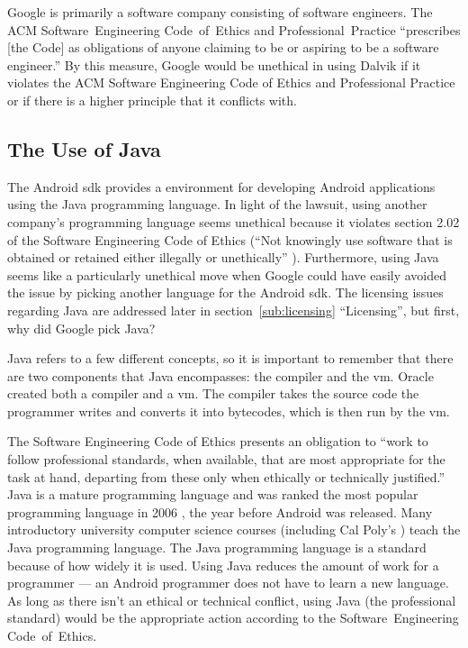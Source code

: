 \documentclass[11pt]{article}
\begin{document}
\begin{multicols}{2}
Google is primarily a software company consisting of software engineers.  The
ACM Software~Engineering Code~of~Ethics and Professional~Practice ``prescribes
[the Code] as obligations of anyone claiming to be or aspiring to be a software
engineer.'' \cite{secode} By this measure, Google would be unethical in using
Dalvik if it violates the ACM Software Engineering Code of Ethics and
Professional Practice or if there is a higher principle that it conflicts with.


\subsection{The Use of Java} %
\label{sub:java}

The Android \gls{sdk} provides a environment for developing Android applications
using the Java programming language.  In light of the lawsuit, using another
company's programming language seems unethical because it violates section 2.02
of the Software Engineering Code of Ethics (``Not knowingly use software that is
obtained or retained either illegally or unethically'' \cite[\S 2.02]{secode}).
Furthermore, using Java seems like a particularly unethical move when Google
could have easily avoided the issue by picking another language for the Android
\gls{sdk}.  The licensing issues regarding Java are addressed later in
section~\ref{sub:licensing} ``Licensing'', but first, why did Google pick Java?

Java refers to a few different concepts, so it is important to remember that
there are two components that Java encompasses: the compiler and the \gls{vm}.
Oracle created both a compiler and a \gls{vm}.  The compiler takes the source
code the programmer writes and converts it into \glspl{bytecode}, which is then
run by the \gls{vm}.

The Software Engineering Code of Ethics presents an obligation to ``work to
follow professional standards, when available, that are most appropriate for the
task at hand, departing from these only when ethically or technically
justified.'' \cite[\S 3.06]{secode}  Java is a mature programming language and
was ranked the most popular programming language in 2006 \cite[Long term
trends]{tiobe}, the year before Android was released.  Many introductory
university computer science courses (including Cal Poly's \cite{csc102}) teach
the Java programming language.  The Java programming language is a standard
because of how widely it is used.  Using Java reduces the amount of work for a
programmer --- an Android programmer does not have to learn a new language.  As
long as there isn't an ethical or technical conflict, using Java (the
professional standard) would be the appropriate action according to the
Software~Engineering Code~of~Ethics.


\end{multicols}
\end{document}
